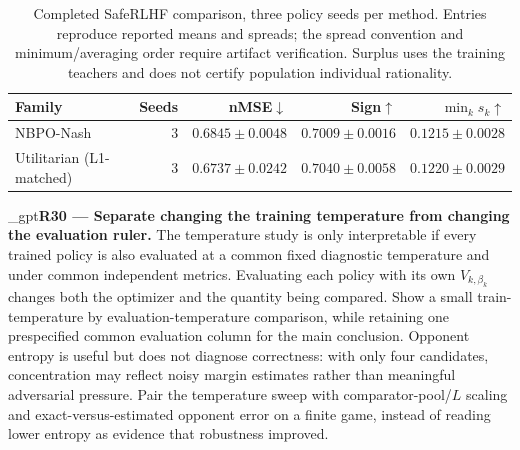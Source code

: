 \documentclass{article}
\newif\ifshowreviews
\newcommand{\reviewresponse}[1]{%
  \ifshowreviews
  \par\begingroup\color{blue!65!black}\hypersetup{allcolors=blue!65!black}\emergencystretch=2em%
  \noindent\textbf{Response:} #1\par\endgroup
  \fi}
\theoremstyle{remark}
\theoremstyle{plain}
\begin{document}
\begin{table}[t]
\centering\small
\setlength{\tabcolsep}{5pt}
\caption{Completed SafeRLHF comparison, three policy seeds per method. Entries reproduce reported means and spreads; the spread convention and minimum/averaging order require artifact verification. Surplus uses the training teachers and does not certify population individual rationality.}
\label{tab:saferlhf-main}
\begin{tabular}{lrrrr}
\toprule
Family & Seeds & nMSE$\downarrow$ & Sign$\uparrow$ & $\min_k s_k\uparrow$\\
\midrule
NBPO-Nash & $3$ & $0.6845\pm0.0048$ & $0.7009\pm0.0016$ & $0.1215\pm0.0028$\\
Utilitarian (L1-matched) & $3$ & $0.6737\pm0.0242$ & $0.7040\pm0.0058$ & $0.1220\pm0.0029$\\
\bottomrule
\end{tabular}
\end{table}



\kekim_gpt{\textbf{R30 --- Separate changing the training temperature from changing the evaluation ruler.} The temperature study is only interpretable if every trained policy is also evaluated at a common fixed diagnostic temperature and under common independent metrics. Evaluating each policy with its own $V_{k,\beta_k}$ changes both the optimizer and the quantity being compared. Show a small train-temperature by evaluation-temperature comparison, while retaining one prespecified common evaluation column for the main conclusion. Opponent entropy is useful but does not diagnose correctness: with only four candidates, concentration may reflect noisy margin estimates rather than meaningful adversarial pressure. Pair the temperature sweep with comparator-pool/$L$ scaling and exact-versus-estimated opponent error on a finite game, instead of reading lower entropy as evidence that robustness improved.}
\reviewresponse{\textbf{R30 --- Partially addressed.} The independent diagnostic fixes $\beta^E=0.25$ and four evaluation comparators for every method, separately from training temperatures. Finite-matrix surplus is not a population value. A train-temperature by evaluation-temperature matrix, together with exact-versus-estimated opponent errors across sample and pool sizes, remains unreported.}
\end{document}
